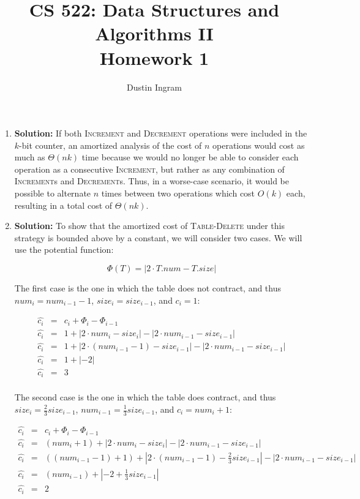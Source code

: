 \documentclass{article}
\title{CS 522: Data Structures and Algorithms II \\ Homework 1}
\author{Dustin Ingram}
\begin{document}
\maketitle
\begin{enumerate}
    \item \textbf{Solution:}
    If both \textsc{Increment} and \textsc{Decrement} operations were included
    in the $k$-bit counter, an amortized analysis of the cost of $n$ operations
    would cost as much as $\Theta(nk)$ time because we would no longer be able
    to consider each operation as a consecutive \textsc{Increment}, but rather
    as any combination of \textsc{Increment}s and \textsc{Decrement}s. Thus, in
    a worse-case scenario, it would be possible to alternate $n$ times between
    two operations which cost $O(k)$ each, resulting in a total cost of
    $\Theta(nk)$.

    \item \textbf{Solution:}
    To show that the amortized cost of \textsc{Table-Delete} under this strategy
    is bounded above by a constant, we will consider two cases. We will use the
    potential function:

    $$ \Phi(T) = | 2\cdot T.num - T.size | $$

    The first case is the one in which the table does not contract, and thus
    $num_{i} = num_{i-1}-1$, $size_{i} = size_{i-1}$, and $c_{i} = 1$:

    \begin{eqnarray*}
        \hat{c_{i}} &=& c_{i} + \Phi_{i} - \Phi_{i-1} \\
        \hat{c_{i}} &=& 1 + |2\cdot num_{i} - size_{i}| - | 2\cdot num_{i-1} - size_{i-1} | \\
        \hat{c_{i}} &=& 1 + |2\cdot(num_{i-1} - 1) - size_{i-1}| - | 2\cdot num_{i-1} - size_{i-1} | \\
        \hat{c_{i}} &=& 1 + |-2| \\
        \hat{c_{i}} &=& 3 \\
    \end{eqnarray*}

    The second case is the one in which the table does contract, and thus
    $size_{i} = \frac{2}{3}size_{i-1}$, $num_{i-1} = \frac{1}{3}size_{i-1}$, and
    $c_{i} = num_{i} + 1$:

    \begin{eqnarray*}
        \hat{c_{i}} &=& c_{i} + \Phi_{i} - \Phi_{i-1} \\
        \hat{c_{i}} &=& (num_{i} +1) + |2\cdot num_{i} - size_{i}| - | 2\cdot num_{i-1} - size_{i-1} | \\
        \hat{c_{i}} &=& ((num_{i-1} - 1) + 1) + |2\cdot(num_{i-1} - 1) - \frac{2}{3}size_{i-1}| - | 2\cdot num_{i-1} - size_{i-1} | \\
        \hat{c_{i}} &=& (num_{i-1}) + |-2 + \frac{1}{3}size_{i-1}| \\
        \hat{c_{i}} &=& 2 \\
    \end{eqnarray*}


\end{enumerate}
\end{document}
